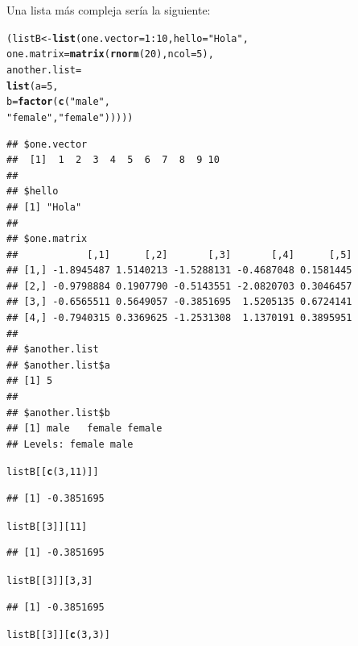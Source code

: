 \documentclass{config/apuntes}\usepackage[]{graphicx}\usepackage[]{xcolor}
\makeatletter
\newcommand{\hlnum}[1]{\textcolor[rgb]{0.686,0.059,0.569}{#1}}%
\newcommand{\hlsng}[1]{\textcolor[rgb]{0.192,0.494,0.8}{#1}}%
\newcommand{\hlopt}[1]{\textcolor[rgb]{0,0,0}{#1}}%
\newcommand{\hldef}[1]{\textcolor[rgb]{0.345,0.345,0.345}{#1}}%
\newcommand{\hlkwb}[1]{\textcolor[rgb]{0.69,0.353,0.396}{#1}}%
\newcommand{\hlkwc}[1]{\textcolor[rgb]{0.333,0.667,0.333}{#1}}%
\newcommand{\hlkwd}[1]{\textcolor[rgb]{0.737,0.353,0.396}{\textbf{#1}}}%
\newenvironment{kframe}{%
 \def\at@end@of@kframe{}%
 \ifinner\ifhmode%
  \def\at@end@of@kframe{\end{minipage}}%
  \begin{minipage}{\columnwidth}%
 \fi\fi%
 \def\FrameCommand##1{\hskip\@totalleftmargin \hskip-\fboxsep
 \colorbox{shadecolor}{##1}\hskip-\fboxsep
     \hskip-\linewidth \hskip-\@totalleftmargin \hskip\columnwidth}%
 \MakeFramed {\advance\hsize-\width
   \@totalleftmargin\z@ \linewidth\hsize
   \@setminipage}}%
 {\par\unskip\endMakeFramed%
 \at@end@of@kframe}
\newenvironment{knitrout}{}{} %
\makeatother
\begin{document}
Una lista más compleja sería la siguiente:
\begin{knitrout}
\color{fgcolor}\begin{kframe}
\begin{alltt}
\hldef{(listB} \hlkwb{<-} \hlkwd{list}\hldef{(}\hlkwc{one.vector} \hldef{=} \hlnum{1}\hlopt{:}\hlnum{10}\hldef{,}  \hlkwc{hello} \hldef{=} \hlsng{"Hola"}\hldef{,}
               \hlkwc{one.matrix} \hldef{=} \hlkwd{matrix}\hldef{(}\hlkwd{rnorm}\hldef{(}\hlnum{20}\hldef{),} \hlkwc{ncol} \hldef{=} \hlnum{5}\hldef{),}
               \hlkwc{another.list} \hldef{=}
               \hlkwd{list}\hldef{(}\hlkwc{a} \hldef{=} \hlnum{5}\hldef{,}
                    \hlkwc{b} \hldef{=} \hlkwd{factor}\hldef{(}\hlkwd{c}\hldef{(}\hlsng{"male"}\hldef{,}
                      \hlsng{"female"}\hldef{,} \hlsng{"female"}\hldef{)))))}
\end{alltt}
\begin{verbatim}
## $one.vector
##  [1]  1  2  3  4  5  6  7  8  9 10
## 
## $hello
## [1] "Hola"
## 
## $one.matrix
##            [,1]      [,2]       [,3]       [,4]      [,5]
## [1,] -1.8945487 1.5140213 -1.5288131 -0.4687048 0.1581445
## [2,] -0.9798884 0.1907790 -0.5143551 -2.0820703 0.3046457
## [3,] -0.6565511 0.5649057 -0.3851695  1.5205135 0.6724141
## [4,] -0.7940315 0.3369625 -1.2531308  1.1370191 0.3895951
## 
## $another.list
## $another.list$a
## [1] 5
## 
## $another.list$b
## [1] male   female female
## Levels: female male
\end{verbatim}
\begin{alltt}
\hldef{listB[[}\hlkwd{c}\hldef{(}\hlnum{3}\hldef{,} \hlnum{11}\hldef{)]]}
\end{alltt}
\begin{verbatim}
## [1] -0.3851695
\end{verbatim}
\begin{alltt}
\hldef{listB[[}\hlnum{3}\hldef{]][}\hlnum{11}\hldef{]}
\end{alltt}
\begin{verbatim}
## [1] -0.3851695
\end{verbatim}
\begin{alltt}
\hldef{listB[[}\hlnum{3}\hldef{]][}\hlnum{3}\hldef{,} \hlnum{3}\hldef{]}
\end{alltt}
\begin{verbatim}
## [1] -0.3851695
\end{verbatim}
\begin{alltt}
\hldef{listB[[}\hlnum{3}\hldef{]][}\hlkwd{c}\hldef{(}\hlnum{3}\hldef{,} \hlnum{3}\hldef{)]}

\end{alltt}
\end{kframe}
\end{knitrout}
\end{document}
